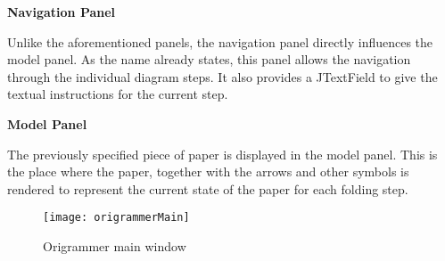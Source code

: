 \textbf{Navigation Panel}

Unlike the aforementioned panels, the navigation panel directly influences the model panel. As the name already states, this panel allows the navigation through the individual diagram steps. It also provides a JTextField to give the textual instructions for the current step.

\textbf{Model Panel}

The previously specified piece of paper is displayed in the model panel. This is the place where the paper, together with the arrows and other symbols is rendered to represent the current state of the paper for each folding step.

\begin{figure}[h]
	\centering
	\texttt{[image: origrammerMain]}
	\caption{Origrammer main window}
	\label{fig:origrammerMain}
\end{figure}